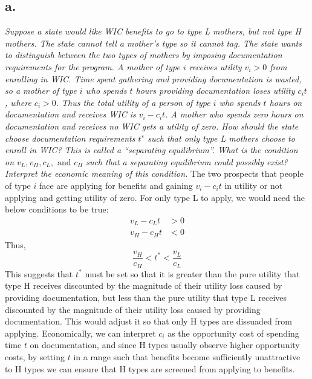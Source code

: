 \documentclass[
]{article}
\begin{document}
\hypertarget{a.-1}{%
\subsection{a.}\label{a.-1}}

\textit{Suppose a state would like WIC benefits to go to type L mothers, but not type H mothers. The state cannot tell a mother’s type so it cannot tag. The state wants to distinguish between the two types of mothers by imposing documentation requirements for the program. A mother of type $i$ receives utility $v_i > 0$ from enrolling in WIC. Time spent gathering and providing documentation is wasted, so a mother of type $i$ who spends $t$ hours providing documentation loses utility $c_i t$, where $c_i > 0$. Thus the total utility of a person of type $i$ who spends $t$ hours on documentation and receives WIC is $v_i − c_i t$. A mother who spends zero hours on documentation and receives no WIC gets a utility of zero. How should the state choose documentation requirements $t^∗$ such that only type L mothers choose to enroll in WIC? This is called a “separating equilibrium”. What is the condition on $v_L, v_H, c_L, \text{ and } c_H$ such that a separating equilibrium could possibly exist? Interpret the economic meaning of this condition.}
\newline \newline \newline The two prospects that people of type \(i\)
face are applying for benefits and gaining \(v_i − c_i t\) in utility or
not applying and getting utility of zero. For only type L to apply, we
would need the below conditions to be true:\\
\[\begin{aligned}
v_L - c_L t &> 0 \\
v_H - c_H t &< 0
\end{aligned}\] Thus, \[\frac{v_H}{c_H} < t^* < \frac{v_L}{c_L}\] This
suggests that \(t^*\) must be set so that it is greater than the pure
utility that type H receives discounted by the magnitude of their
utility loss caused by providing documentation, but less than the pure
utility that type L receives discounted by the magnitude of their
utility loss caused by providing documentation. This would adjust it so
that only H types are dissuaded from applying. Economically, we can
interpret \(c_i\) as the opportunity cost of spending time \(t\) on
documentation, and since H types usually observe higher opportunity
costs, by setting \(t\) in a range such that benefits become
sufficiently unattractive to H types we can ensure that H types are
screened from applying to benefits.
\end{document}
